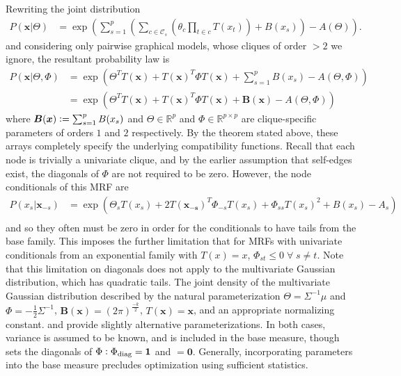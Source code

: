 \documentclass{samkoelleprelimworking}
\begin{document}
Rewriting the joint distribution
\begin{align}
 P(\bm{x} \vert \Theta) &= \exp{ (\sum_{s=1}^p ( \sum_{c \in \mathcal{C}_s} (\theta_c \prod_{t \in c} T(x_t) ) + B(x_s)) - A(\Theta ))}.
 \end{align}
 and considering only pairwise graphical models, whose cliques of order $> 2$ we ignore, the resultant probability law is
 \begin{align}
  P(\bm{x} \vert \Theta,\Phi) &= \exp(\Theta^{T} T(\bm{x}) + T(\bm{x})^T\Phi  T(\bm{x}) + \sum_{s=1}^p B(x_s) - A(\Theta, \Phi)) \\
  &= \exp(\Theta^{T} T(\bm{x}) + T(\bm{x})^T\Phi  T(\bm{x}) + \bm{B}(\bm{x}) - A(\Theta, \Phi))
  \end{align}
 where $\bm{B}(\bm{x})  \vcentcolon = \sum_{s=1}^p B(x_s)$ and $\Theta \in \mathbb{R}^p$ and $\Phi \in \mathbb{R}^{p\times p}$ are clique-specific parameters of orders $1$ and $2$ respectively. By the theorem stated above, these arrays completely specify the underlying compatibility functions.  Recall that each node is trivially a univariate clique, and by the earlier assumption that self-edges exist, the diagonals of $\Phi$ are not required to be zero.   However, the node conditionals of this MRF are 
 \begin{align}
 P(x_s \vert \bm{x}_{-s}) &= \exp ( \Theta_s T(x_s) + 2 T(\bm{x_{-s}})^T \Phi_{-s} T(x_s) + \Phi_{ss} {T(x_s)}^2 + B(x_s) - A_s) \\
 \end{align}
and so they often must be zero in order for the conditionals to have tails from the base family.  This imposes the further limitation that for MRFs with univariate conditionals from an exponential family with $T(x) = x$, $\Phi_{st} \leq 0 \; \forall \; s \neq t$.   Note that this limitation on diagonals does not apply to the multivariate Gaussian distribution, which has quadratic tails.  The joint density of the multivariate Gaussian distribution described by the natural parameterization $\Theta = \Sigma^{-1} \mu$ and $\Phi = -\frac{1}{2}\Sigma^{-1}$, $\bm{B}(\bm{x}) = {(2 \pi )} ^{\frac{-k}{2}}$, $T(\bm{x}) = \bm{x}$, and an appropriate normalizing constant.   \citep{Besag1974-qb} and \citep{Yang2013-wa} provide slightly alternative parameterizations.   In both cases, variance is assumed to be known, and is included in the base measure, though \citep{Besag1974-qb} sets the diagonals of $\Phi \vcentcolon \Phi_{\text{diag}} = \bm{1}$ and \citep{Yang2013-wa} $= \bm{0}$.  Generally, incorporating parameters into the base measure precludes optimization using sufficient statistics.  
\end{document}
